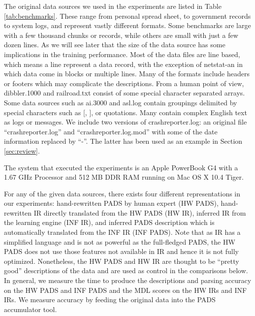 The original data sources we used in the experiments are listed in Table \ref{tab:benchmarks}.
These range from personal spread sheet, to government records to system logs, and 
represent vastly different formats. Some benchmarks are large with a few thousand
chunks or records, while others are small with just a few dozen lines. As we will see later
that the size of the data source has some implications in the training performance.
Most of the data files are line based, which means a line represent a data record, with
the exception of netstat-an in which data come in blocks or multiple lines.
Many of the formats include headers or footers which may complicate the descriptions.
From a human point of view, dibbler.1000 and railroad.txt consist of some special
character separated arrays. Some data sources such as ai.3000 and asl.log
contain groupings delimited by special characters such as [, ], or quotations.
Many contain complex English text as logs or messages.
We include two versions of crashreporter.log: an original file ``crashreporter.log''
and ``crashreporter.log.mod'' with some of the date information replaced by ``-''. 
The latter has been used as an example in Section \ref{sec:review}. 

The system that executed the experiments is an 
Apple PowerBook G4 with a 1.67 GHz Processor and 512 MB DDR RAM 
running on Mac OS X 10.4 Tiger. 


For any of the given data sources, there exists four different representations in 
our experiments: hand-rewritten PADS by human expert (HW PADS), hand-rewritten IR directly
translated from the HW PADS (HW IR), inferred IR from the learning engine (INF IR), and
inferred PADS description which is automatically translated from the INF IR (INF PADS). 
Note that as IR has a simplified language and is not as powerful as the full-fledged
PADS, the HW PADS does not use those features not available in IR and hence it is
not fully optimized. 
Nonetheless, the HW PADS and HW IR are thought to be ``pretty good'' descriptions of
the data and are used as control in the comparisons below. 
In general, we measure the time to produce the descriptions and parsing accuracy on
the HW PADS and INF PADS and the MDL scores on the HW IRs and INF IRs.
We measure accuracy by feeding the original data into the PADS accumulator tool.

